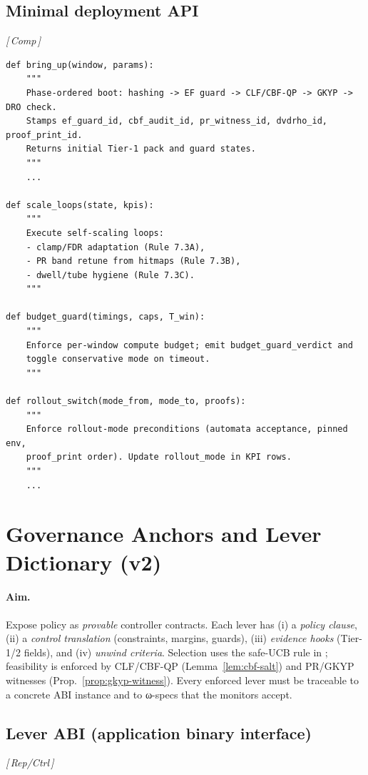 \documentclass[10pt]{article}
\makeatletter
\newcommand{\layertag}[1]{\textsf{\footnotesize[\,#1\,]}}
\newcommand{\JSGxref}[2]{%
  \@ifundefined{r@#2}{\textbf{[#1 ??]}}{#1~\ref{#2}}}
\newcommand{\secref}[1]{\JSGxref{§}{#1}}
\makeatother
\begin{document}
\subsection{Minimal deployment API}\label{subsec:deploy-api}
\emph{\layertag{Comp}}
\begin{lstlisting}
def bring_up(window, params):
    """
    Phase-ordered boot: hashing -> EF guard -> CLF/CBF-QP -> GKYP -> DRO check.
    Stamps ef_guard_id, cbf_audit_id, pr_witness_id, dvdrho_id, proof_print_id.
    Returns initial Tier-1 pack and guard states.
    """
    ...

def scale_loops(state, kpis):
    """
    Execute self-scaling loops:
    - clamp/FDR adaptation (Rule 7.3A),
    - PR band retune from hitmaps (Rule 7.3B),
    - dwell/tube hygiene (Rule 7.3C).
    """

def budget_guard(timings, caps, T_win):
    """
    Enforce per-window compute budget; emit budget_guard_verdict and
    toggle conservative mode on timeout.
    """

def rollout_switch(mode_from, mode_to, proofs):
    """
    Enforce rollout-mode preconditions (automata acceptance, pinned env,
    proof_print order). Update rollout_mode in KPI rows.
    """
    ...
\end{lstlisting}


\section{Governance Anchors and Lever Dictionary (v2)}\label{sec:gov-v2}

\paragraph{Aim.}
Expose policy as \emph{provable} controller contracts. Each lever has (i) a \emph{policy clause}, (ii) a \emph{control translation} (constraints, margins, guards), (iii) \emph{evidence hooks} (Tier-1/2 fields), and (iv) \emph{unwind criteria}. Selection uses the safe-UCB rule in \secref{subsec:levers}; feasibility is enforced by CLF/CBF-QP (Lemma~\ref{lem:cbf-salt}) and PR/GKYP witnesses (Prop.~\ref{prop:gkyp-witness}). Every enforced lever must be traceable to a concrete ABI instance and to ω-specs that the monitors accept.

\subsection{Lever ABI (application binary interface)}\label{subsec:lever-abi}
\emph{\layertag{Rep/Ctrl}}
\end{document}
